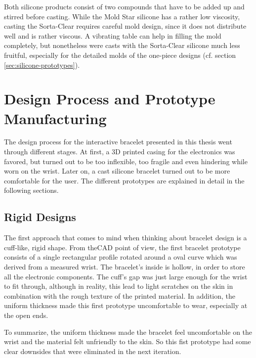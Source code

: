 Both silicone products consist of two compounds that have to be added up and stirred before casting. While the Mold Star silicone has a rather low viscosity, casting the Sorta-Clear requires careful mold design, since it does not distribute well and is rather viscous. A vibrating table can help in filling the mold completely, but nonetheless were casts with the Sorta-Clear silicone much less fruitful, especially for the detailed molds of the one-piece designs (cf. section \ref{sec:silicone-prototypes}).

\section{Design Process and Prototype Manufacturing}

The design process for the interactive bracelet presented in this thesis went through different stages. At first, a 3D printed casing for the electronics was favored, but turned out to be too inflexible, too fragile and even hindering while worn on the wrist. Later on, a cast silicone bracelet turned out to be more comfortable for the user. The different prototypes are explained in detail in the following sections.

\subsection{Rigid Designs}

The first approach that comes to mind when thinking about bracelet design is a cuff-like, rigid shape. From the\ac{CAD} point of view, the first bracelet prototype consists of a single rectangular profile rotated around a oval curve which was derived from a measured wrist. The bracelet's inside is hollow, in order to store all the electronic components. The cuff's gap was just large enough for the wrist to fit through, although in reality, this lead to light scratches on the skin in combination with the rough texture of the printed material. In addition, the uniform thickness made this first prototype uncomfortable to wear, especially at the open ends. 

To summarize, the uniform thickness made the bracelet feel uncomfortable on the wrist and the material felt unfriendly to the skin. So this fist prototype had some clear downsides that were eliminated in the next iteration.

